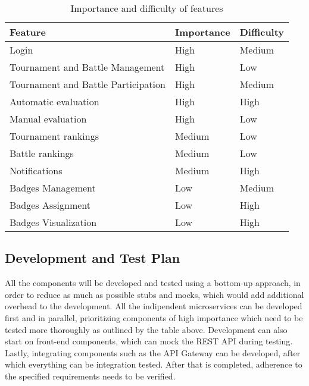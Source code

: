 \begin{table}[H]
    \centering
    \begin{tabular}{|l|l|l|}
        \hline
        \textbf{Feature}                    & \textbf{Importance} & \textbf{Difficulty} \\\hline
        Login                               & High                & Medium              \\
        Tournament and Battle Management    & High                & Low                 \\
        Tournament and Battle Participation & High                & Medium              \\
        Automatic evaluation                & High                & High                \\
        Manual evaluation                   & High                & Low                 \\
        Tournament rankings                 & Medium              & Low                 \\
        Battle rankings                     & Medium              & Low                 \\
        Notifications                       & Medium              & High                \\
        Badges Management                   & Low                 & Medium              \\
        Badges Assignment                   & Low                 & High                \\
        Badges Visualization                & Low                 & High                \\\hline
    \end{tabular}
    \caption{Importance and difficulty of features}
    \label{table:Importance and difficulty of features}
\end{table}

\subsection{Development and Test Plan}
All the components will be developed and tested using a bottom-up approach, in order to reduce as
much as possible stubs and mocks, which would add additional overhead to the development.
All the indipendent microservices can be developed first and in parallel, prioritizing components
of high importance which need to be tested more thoroughly as outlined by the table above.
Development can also start on front-end components, which can mock the REST API during testing.
Lastly, integrating components such as the API Gateway can be developed, after which everything
can be integration tested. After that is completed, adherence to the specified requirements
needs to be verified.

